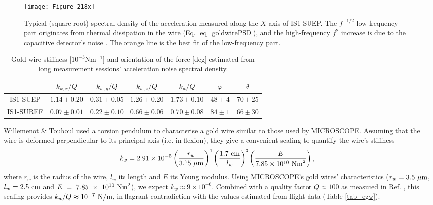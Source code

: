 \documentclass[12pt]{iopart}
\begin{document}
\begin{figure}%
\begin{center}
\texttt{[image: Figure\_218x]}
\caption{Typical (square-root) spectral density of the acceleration measured along the $X$-axis of IS1-SUEP. The $f^{-1/2}$ low-frequency part originates from thermal dissipation in the wire (Eq. \ref{eq_goldwirePSD}), and the high-frequency $f^2$ increase is due to the capacitive detector's noise \cite{touboul09}. The orange line is the best fit of the low-frequency part.}
\label{fig_spectrumX}
\end{center}
\end{figure}

\begin{table}%
\caption{Gold wire stiffness [$10^{-3}$Nm$^{-1}$] and orientation of the force [deg] estimated from long measurement sessions' acceleration noise spectral density.}
\begin{center}
\begin{tabular}{ccccccc}
\hline
& $k_{w,x}/Q$ & $k_{w,y}/Q$ & $k_{w,z}/Q$ & $k_w/Q$ & $\varphi$ & $\theta$ \\
\hline
IS1-SUEP & $1.14\pm0.20$ & $0.31\pm0.05$ & $1.26\pm0.20$ & $1.73\pm0.10$ & $48\pm4$ & $70\pm25$ \\
IS1-SUREF & $0.07\pm0.01$ & $0.22\pm 0.10$ & $0.66\pm0.06$ & $0.70\pm0.08$ & $84\pm1$ & $66\pm30$ \\
\hline
\end{tabular}
\end{center}\label{tab_egw}
\label{default}
\end{table}%


Willemenot \& Touboul \cite{willemenot00} used a torsion pendulum to characterise a gold wire similar to those used by MICROSCOPE. Assuming that the wire is deformed perpendicular to its principal axis (i.e. in flexion), they give a convenient scaling to quantify the wire's stiffness
\begin{equation}
k_w = 2.91\times10^{-5} \left(\frac{r_w}{3.75~\mu{\rm m}}\right)^4 \left(\frac{1.7~{\rm cm}}{l_w}\right)^3 \left(\frac{E}{7.85\times10^{10}~{\rm Nm}^2}\right),
\end{equation}
where $r_w$ is the radius of the wire, $l_w$ its length and $E$ its Young modulus. Using MICROSCOPE's gold wires' characteristics ($r_w=3.5~\mu{\rm m}$, $l_w=2.5~{\rm cm}$ and $E~=~7.85~\times~10^{10}~{\rm Nm}^2$), we expect $k_w \approx 9\times10^{-6}$.
Combined with a quality factor $Q\approx 100$ as measured in Ref. \cite{willemenot00}, this scaling provides $k_w/Q \approx 10^{-7}~{\rm N/m}$, in flagrant contradiction with the values estimated from flight data (Table \ref{tab_egw}).
\end{document}
